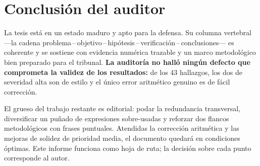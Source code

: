 \documentclass[11pt,a4paper]{article}
\begin{document}
\section{Conclusión del auditor}

La tesis está en un estado maduro y apto para la defensa. Su columna vertebral —la cadena
problema\,--\,objetivo\,--\,hipótesis\,--\,verificación\,--\,conclusiones— es coherente y se sostiene con
evidencia numérica trazable y un marco metodológico bien preparado para el tribunal. \textbf{La
auditoría no halló ningún defecto que comprometa la validez de los resultados:} de los 43 hallazgos,
los dos de severidad alta son de estilo y el único error aritmético genuino es de fácil corrección.

El grueso del trabajo restante es editorial: podar la redundancia transversal, diversificar un puñado
de expresiones sobre-usadas y reforzar dos flancos metodológicos con frases puntuales. Atendidas la
corrección aritmética y las mejoras de solidez de prioridad media, el documento quedará en condiciones
óptimas. Este informe funciona como hoja de ruta; la decisión sobre cada punto corresponde al autor.
\end{document}
